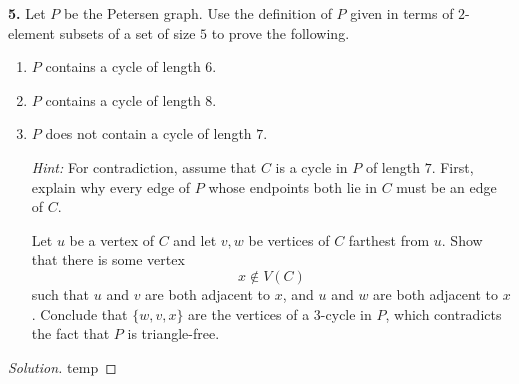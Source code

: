 \documentclass[12pt]{amsart}
\theoremstyle{conjecture}
\theoremstyle{definition}
\theoremstyle{question}
\theoremstyle{theorem}
\newenvironment{solution}
{\begin{proof}[Solution]}
{\end{proof}}
\begin{document}
    \textbf{5.} Let $P$ be the Petersen graph. Use the definition of $P$ given
    in terms of $2$-element subsets of a set of size $5$ to prove the
    following.

    \begin{enumerate}[label=(\alph*)]
    \item $P$ contains a cycle of length $6$.

    \item $P$ contains a cycle of length $8$.

    \item $P$ does not contain a cycle of length $7$.

    \medskip

    \noindent
    \textit{Hint:} For contradiction, assume that $C$ is a cycle in
    $P$ of length $7$. First, explain why every edge of $P$ whose
    endpoints both lie in $C$ must be an edge of $C$.

    Let $u$ be a vertex of $C$ and let $v,w$ be vertices of $C$
    farthest from $u$. Show that there is some vertex
    \[
        x \notin V(C)
    \]
    such that $u$ and $v$ are both adjacent to $x$, and $u$ and $w$
    are both adjacent to $x$. Conclude that $\{w,v,x\}$ are the
    vertices of a $3$-cycle in $P$, which contradicts the fact that
    $P$ is triangle-free.
    \end{enumerate}

    \begin{solution}
        temp
    \end{solution}
\end{document}
